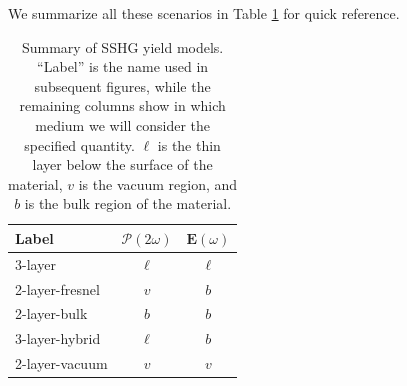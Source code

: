 We summarize all these scenarios in Table \ref{tab:models} for quick reference.

\begin{table}[t]
\centering
\begin{tabular}{| l | c | c |}
\hline 
Label           &  $\boldsymbol{\mathcal{P}}(2\omega)$  &  $\mathbf{E}(\omega)$ \\
\hline 
3-layer         &          $\ell$           &      $\ell$   \\
2-layer-fresnel &            $v$            &        $b$    \\
2-layer-bulk    &            $b$            &        $b$    \\
3-layer-hybrid  &          $\ell$           &        $b$    \\
2-layer-vacuum  &            $v$            &        $v$    \\
\hline 
\end{tabular}
\caption{Summary of SSHG yield models. ``Label'' is the name used in subsequent figures, while the remaining columns show in which medium we will consider the specified quantity. $\ell$ is the thin layer below the surface of the material, $v$ is the vacuum region, and $b$ is the bulk region of the material.}
\label{tab:models}
\end{table}
